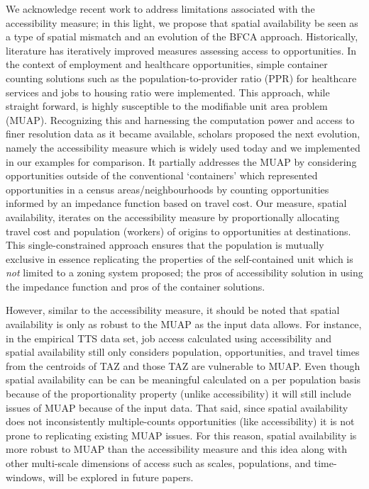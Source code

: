 \documentclass[]{elsarticle} %
\begin{document}
We acknowledge recent work to address limitations associated with the
accessibility measure; in this light, we propose that spatial
availability be seen as a type of spatial mismatch and an evolution of
the BFCA approach. Historically, literature has iteratively improved
measures assessing access to opportunities. In the context of employment
and healthcare opportunities, simple container counting solutions such
as the population-to-provider ratio (PPR) for healthcare services and
jobs to housing ratio were implemented. This approach, while straight
forward, is highly susceptible to the modifiable unit area problem
(MUAP). Recognizing this and harnessing the computation power and access
to finer resolution data as it became available, scholars proposed the
next evolution, namely the accessibility measure which is widely used
today and we implemented in our examples for comparison. It partially
addresses the MUAP by considering opportunities outside of the
conventional `containers' which represented opportunities in a census
areas/neighbourhoods by counting opportunities informed by an impedance
function based on travel cost. Our measure, spatial availability,
iterates on the accessibility measure by proportionally allocating
travel cost and population (workers) of origins to opportunities at
destinations. This single-constrained approach ensures that the
population is mutually exclusive in essence replicating the properties
of the self-contained unit which is \emph{not} limited to a zoning
system proposed; the pros of accessibility solution in using the
impedance function and pros of the container solutions.

However, similar to the accessibility measure, it should be noted that
spatial availability is only as robust to the MUAP as the input data
allows. For instance, in the empirical TTS data set, job access
calculated using accessibility and spatial availability still only
considers population, opportunities, and travel times from the centroids
of TAZ and those TAZ are vulnerable to MUAP. Even though spatial
availability can be can be meaningful calculated on a per population
basis because of the proportionality property (unlike accessibility) it
will still include issues of MUAP because of the input data. That said,
since spatial availability does not inconsistently multiple-counts
opportunities (like accessibility) it is not prone to replicating
existing MUAP issues. For this reason, spatial availability is more
robust to MUAP than the accessibility measure and this idea along with
other multi-scale dimensions of access such as scales, populations, and
time-windows, will be explored in future papers.
\end{document}
